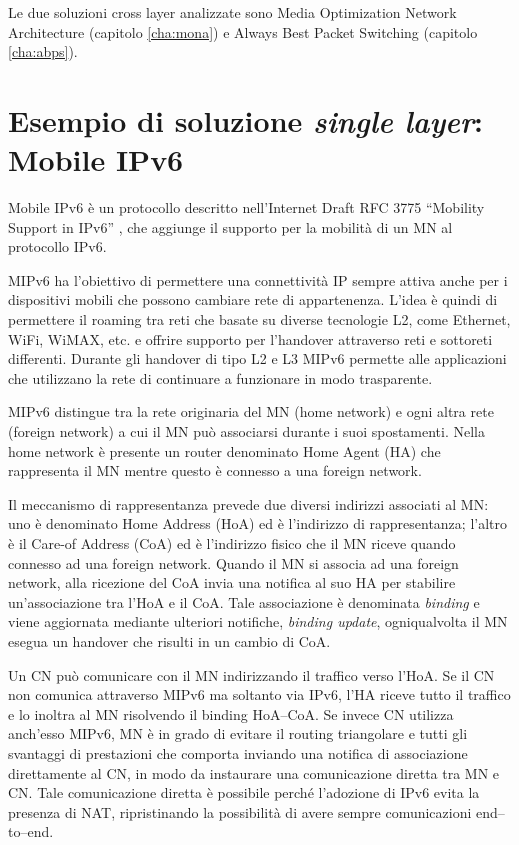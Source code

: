 \documentclass[12pt,a4paper,openright,twoside]{book}
\begin{document}
Le due soluzioni cross layer analizzate sono Media Optimization
Network Architecture (capitolo \ref{cha:mona}) e Always Best Packet
Switching (capitolo \ref{cha:abps}).

\section{Esempio di soluzione \emph{single layer}: Mobile IPv6}

Mobile IPv6 è un protocollo descritto nell'Internet Draft RFC 3775
``Mobility Support in IPv6'' \cite{bib:mipv6}, che aggiunge il
supporto per la mobilità di un MN al protocollo IPv6.

MIPv6 ha l'obiettivo di permettere una connettività IP sempre attiva
anche per i dispositivi mobili che possono cambiare rete di
appartenenza. L'idea è quindi di permettere il roaming tra reti
che basate su diverse tecnologie L2, come Ethernet, WiFi, WiMAX,
etc. e offrire supporto per l'handover attraverso reti e sottoreti
differenti. Durante gli handover di tipo L2 e L3 MIPv6 permette alle
applicazioni che utilizzano la rete di continuare a funzionare in modo
trasparente.

MIPv6 distingue tra la rete originaria del MN (home network) e ogni
altra rete (foreign network) a cui il MN può associarsi durante i suoi
spostamenti. Nella home network è presente un router denominato Home
Agent (HA) che rappresenta il MN mentre questo è connesso a una
foreign network.

Il meccanismo di rappresentanza prevede due diversi indirizzi
associati al MN: uno è denominato Home Address (HoA) ed è l'indirizzo
di rappresentanza; l'altro è il Care-of Address (CoA) ed è l'indirizzo
fisico che il MN riceve quando connesso ad una foreign network. Quando
il MN si associa ad una foreign network, alla ricezione del CoA invia
una notifica al suo HA per stabilire un'associazione tra l'HoA e il
CoA. Tale associazione è denominata \emph{binding} e viene aggiornata
mediante ulteriori notifiche, \emph{binding update}, ogniqualvolta il
MN esegua un handover che risulti in un cambio di CoA.

Un CN può comunicare con il MN indirizzando il traffico verso
l'HoA. Se il CN non comunica attraverso MIPv6 ma soltanto via IPv6,
l'HA riceve tutto il traffico e lo inoltra al MN risolvendo il binding
HoA--CoA. Se invece CN utilizza anch'esso MIPv6, MN è in grado di
evitare il routing triangolare e tutti gli svantaggi di prestazioni
che comporta inviando una notifica di associazione direttamente al CN,
in modo da instaurare una comunicazione diretta tra MN e CN. Tale
comunicazione diretta è possibile perché l'adozione di IPv6 evita la
presenza di NAT, ripristinando la possibilità di avere sempre
comunicazioni end--to--end.
\end{document}
